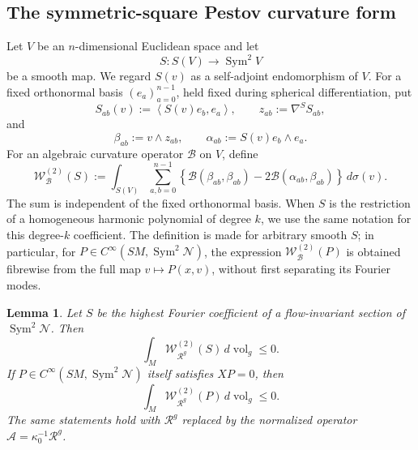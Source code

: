 \documentclass[reqno,11pt]{amsart}
\newtheorem{lemma}[theorem]{Lemma}
\theoremstyle{definition}
\newcommand{\SM}{SM}
\newcommand{\cN}{\mathcal N}
\newcommand{\Rop}{\mathscr R}
\newcommand{\cA}{\mathcal A}
\newcommand{\cB}{\mathcal B}
\newcommand{\Sym}{\operatorname{Sym}}
\newcommand{\vol}{\operatorname{vol}}
\newcommand{\inner}[2]{\left\langle #1,#2\right\rangle}
\begin{document}
\subsection{The symmetric-square Pestov curvature form}

Let $V$ be an $n$-dimensional Euclidean space and let
$$
  S:S(V)\longrightarrow\Sym^2V
$$
be a smooth map. We regard $S(v)$ as a self-adjoint endomorphism of $V$.
For a fixed orthonormal basis $(e_a)_{a=0}^{n-1}$, held fixed during
spherical differentiation, put
$$
  S_{ab}(v):=\inner{S(v)e_b}{e_a},
  \qquad
  z_{ab}:=\nabla^S S_{ab},
$$
and
$$
  \beta_{ab}:=v\wedge z_{ab},
  \qquad
  \alpha_{ab}:=S(v)e_b\wedge e_a.
$$
For an algebraic curvature operator $\cB$ on $V$, define
\begin{equation}\label{eq:sym2-fibrewise-pestov-form}
  \mathscr W^{(2)}_{\cB}(S)
  :=\int_{S(V)}\sum_{a,b=0}^{n-1}
  \left\{
    \cB(\beta_{ab},\beta_{ab})
    -2\cB(\alpha_{ab},\beta_{ab})
  \right\}\,d\sigma(v).
\end{equation}
The sum is independent of the fixed orthonormal basis. When $S$ is the
restriction of a homogeneous harmonic polynomial of degree $k$, we use the same
notation for this degree-$k$ coefficient. The definition is made for arbitrary
smooth $S$; in particular, for
$P\in C^\infty(\SM,\Sym^2\cN)$, the expression
$\mathscr W^{(2)}_{\cB}(P)$ is obtained fibrewise from the full map
$v\mapsto P(x,v)$, without first separating its Fourier modes.

\begin{lemma}
\label{lem:sym2-pestov-sign}
Let $S$ be the highest Fourier coefficient of a flow-invariant section of
$\Sym^2\cN$. Then
\begin{equation}\label{eq:sym2-localized-sign}
  \int_M\mathscr W^{(2)}_{\Rop^g}(S)\,d\vol_g\leq0.
\end{equation}
If $P\in C^\infty(\SM,\Sym^2\cN)$ itself satisfies $XP=0$, then
\begin{equation}\label{eq:sym2-full-sign}
  \int_M\mathscr W^{(2)}_{\Rop^g}(P)\,d\vol_g\leq0.
\end{equation}
The same statements hold with $\Rop^g$ replaced by the normalized operator
$\cA=\kappa_0^{-1}\Rop^g$.
\end{lemma}
\end{document}
